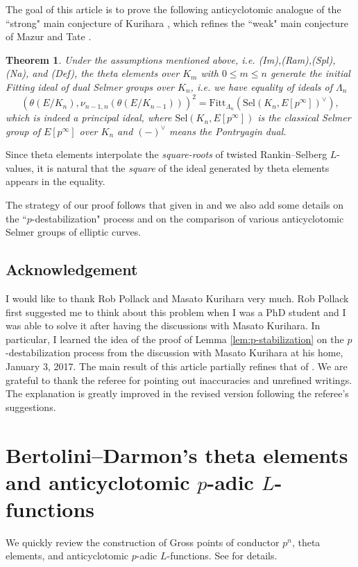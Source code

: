 \documentclass[11pt]{amsart}
\numberwithin{equation}{section}
\newtheorem{thm}{Theorem}[section]
\theoremstyle{definition}
\begin{document}
The goal of this article is to prove the following anticyclotomic analogue of the ``strong" main conjecture of Kurihara \cite[Conj. 0.3]{kurihara-invent}, which refines the ``weak" main conjecture of Mazur and Tate \cite[Conj. 3]{mazur-tate}.
\begin{thm} \label{thm:main}
Under the assumptions mentioned above, i.e. (Im),(Ram),(Spl),(Na), and (Def), 
the theta elements over $K_m$ with $0 \leq m \leq n$ generate the initial Fitting ideal of dual Selmer groups over $K_n$, i.e.
we have equality of ideals of $\Lambda_n$
$$\left( \theta(E/K_n) , \nu_{n-1, n} \left( \theta(E/K_{n-1}) \right) \right)^2  = \mathrm{Fitt}_{\Lambda_n} \left( \mathrm{Sel}(K_n, E[p^\infty])^\vee \right) ,$$
which is indeed a principal ideal, where $\mathrm{Sel}(K_n, E[p^\infty])$ is the classical Selmer group of $E[p^\infty]$ over $K_n$ and $(-)^\vee$ means the Pontryagin dual.
\end{thm}
Since theta elements interpolate the \emph{square-roots} of twisted Rankin--Selberg $L$-values, it is natural that the \emph{square} of the ideal generated by theta elements appears in the equality. 

The strategy of our proof follows that given in \cite{kim-kurihara} and we also add some details on the ``$p$-destabilization" process and on the comparison of various anticyclotomic Selmer groups of elliptic curves.

\subsection*{Acknowledgement}
I would like to thank Rob Pollack and Masato Kurihara very much.
Rob Pollack first suggested me to think about this problem when I was a PhD student and I was able to solve it after having the discussions with Masato Kurihara.
In particular, I learned the idea of the 
proof of Lemma \ref{lem:p-stabilization} on the $p$-destabilization process from the discussion with Masato Kurihara at his home, January 3, 2017.
The main result of this article partially refines that of \cite{kim-mazur-tate}.
We are grateful to thank the referee for pointing out inaccuracies and unrefined writings.
The explanation is greatly improved in the revised version following the referee's suggestions.

\section{Bertolini--Darmon's theta elements and anticyclotomic $p$-adic $L$-functions} \label{sec:bertolini-darmon-elements}
We quickly review the construction of Gross points of conductor $p^n$, theta elements, and anticyclotomic $p$-adic $L$-functions. 
See  \cite{chida-hsieh-main-conj, chida-hsieh-p-adic-L-functions, kim-overconvergent} for details.
\end{document}
